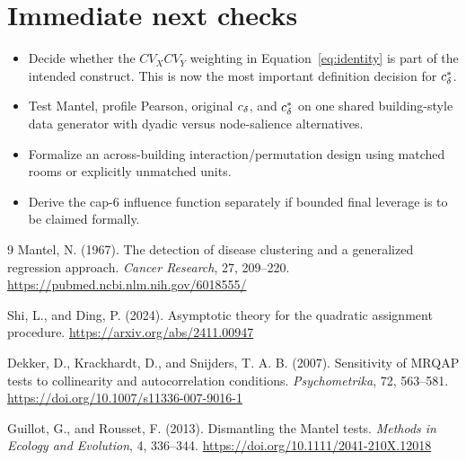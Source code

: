 \section{Immediate next checks}

\begin{itemize}
\item Decide whether the $CV_XCV_Y$ weighting in Equation~\eqref{eq:identity}
is part of the intended construct. This is now the most important definition
decision for $c_\delta^\ast$.
\item Test Mantel, profile Pearson, original $c_\delta$, and $c_\delta^\ast$ on one shared
building-style data generator with dyadic versus node-salience alternatives.
\item Formalize an across-building interaction/permutation design using
matched rooms or explicitly unmatched units.
\item Derive the cap-6 influence function separately if bounded final leverage
is to be claimed formally.
\end{itemize}

\begin{thebibliography}{9}
Mantel, N. (1967). The detection of disease clustering and a generalized
regression approach. \emph{Cancer Research}, 27, 209--220.
\url{https://pubmed.ncbi.nlm.nih.gov/6018555/}

Shi, L., and Ding, P. (2024). Asymptotic theory for the quadratic assignment
procedure. \url{https://arxiv.org/abs/2411.00947}

Dekker, D., Krackhardt, D., and Snijders, T. A. B. (2007). Sensitivity of
MRQAP tests to collinearity and autocorrelation conditions.
\emph{Psychometrika}, 72, 563--581.
\url{https://doi.org/10.1007/s11336-007-9016-1}

Guillot, G., and Rousset, F. (2013). Dismantling the Mantel tests.
\emph{Methods in Ecology and Evolution}, 4, 336--344.
\url{https://doi.org/10.1111/2041-210X.12018}
\end{thebibliography}
